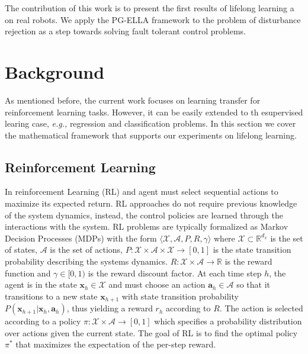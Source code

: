 \documentclass{aamas2016}
\renewcommand{\Re}{\mathbb{R}}
\begin{document}

The contribution of this work is to present the first results of lifelong learning a on real robots.
{\color{red} We apply the PG-ELLA framework \cite{BouAmmar2014a} to the problem of disturbance rejection as a step towards solving fault tolerant control problems.}


\section{Background} \label{background}
As mentioned before, the current work focuses on learning transfer for reinforcement learning tasks. However, it can be easily extended
to th esupervised learing case, \emph{e.g.,} regression and classification problems. In this section we cover the mathematical framework that
supports our experiments on lifelong learning.

\subsection{Reinforcement Learning}

In reinforcement Learning (RL) and agent must select sequential actions to maximize its expected return. RL approaches do not 
require previous knowledge of the system dynamics, instead, the control policies are learned through the interactions with the system.
RL problems are typically formalized as Markov Decision Processes (MDPs) with the form $\langle \mathcal{X}, \mathcal{A}, P, R, \gamma \rangle$ where
$\mathcal{X}\subset\Re^{d_{x}}$ is the set of states, $\mathcal{A}$ is the set of actions, 
$P:\mathcal{X}\times \mathcal{A}\times \mathcal{X}\rightarrow [0,1]$ is the state transition probability describing the systems dynamics.
$R:\mathcal{X}\times \mathcal{A} \rightarrow \Re$ is the reward function and $\gamma \in [0,1)$ is the reward discount factor. At each time 
step $h$, the agent is in the state $\mathbf{x}_{h} \in \mathcal{X}$ and must choose an action $\mathbf{a}_{h} \in \mathcal{A}$ so that
it transitions to a new state $\mathbf{x}_{h+1}$ with state transition probability 
$P(\mathbf{x}_{h+1}|\mathbf{x}_{h},\mathbf{a}_{h})$, thus yielding 
a reward $r_{h}$ according to $R$. The action is selected according to a policy $\pi:\mathcal{X}\times \mathcal{A} \rightarrow [0,1]$ which
specifies a probability distribution over actions given the current state. The goal of RL is to find the optimal policy $\pi^{*}$ 
that maximizes the expectation of the per-step reward.
\end{document}
